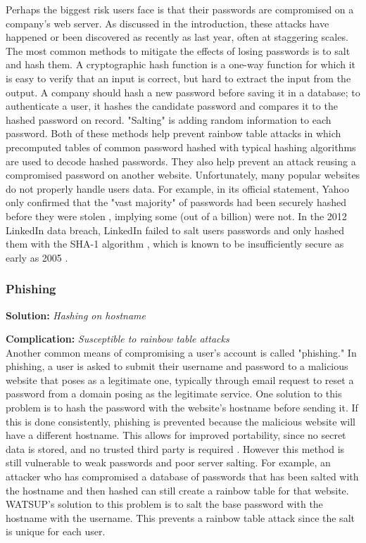 Perhaps the biggest risk users face is that their passwords are compromised on a company's web server. As discussed in the introduction, these attacks have happened or been discovered as recently as last year, often at staggering scales. The most common methods to mitigate the effects of losing passwords is to salt and hash them. A cryptographic hash function is a one-way function for which it is easy to verify that an input is correct, but hard to extract the input from the output. A company should hash a new password before saving it in a database; to authenticate a user, it hashes the candidate password and compares it to the hashed password on record. "Salting" is adding random information to each password. Both of these methods help prevent rainbow table attacks in which precomputed tables of common password hashed with typical hashing algorithms are used to decode hashed passwords. They also help prevent an attack reusing a compromised password on another website. Unfortunately, many popular websites do not properly handle users data. For example, in its official statement, Yahoo only confirmed that the "vast majority" of passwords had been securely hashed before they were stolen \cite{Lord:2016}, implying some (out of a billion) were not. In the 2012 LinkedIn data breach, LinkedIn failed to salt users passwords and only hashed them with the SHA-1 algorithm \cite{Perlroth:2012, Hackett:2016}, which is known to be insufficiently secure as early as 2005 \cite{Wang:2005}.


\subsubsection{Phishing}

\textbf{Solution:} \emph{Hashing on hostname}

\noindent\textbf{Complication:} \emph{Susceptible to rainbow table attacks}\\

Another common means of compromising a user's account is called "phishing." In phishing, a user is asked to submit their username and password to a malicious website that poses as a legitimate one, typically through email request to reset a password from a domain posing as the legitimate service. One solution to this problem is to hash the password with the website's hostname before sending it. If this is done consistently, phishing is prevented because the malicious website will have a different hostname. This allows for improved portability, since no secret data is stored, and no trusted third party is required \cite{Halderman:2005}. However this method is still vulnerable to weak passwords and poor server salting. For example, an attacker who has compromised a database of passwords that has been salted with the hostname and then hashed can still create a rainbow table for that website. WATSUP's solution to this problem is to salt the base password with the hostname with the username. This prevents a rainbow table attack since the salt is unique for each user.


